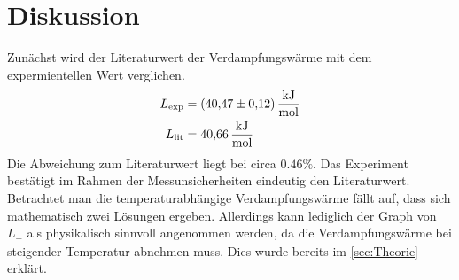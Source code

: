 \section{Diskussion}
\label{sec:Diskussion}
Zunächst wird der Literaturwert \cite{Ingenieurwissen} der Verdampfungswärme mit dem expermientellen Wert verglichen. 
\begin{align*}
    L_\text{exp} &= \qty{40.47 +- 0.12}{\kilo\joule\per\mol} \\
    L_\text{lit} &= \qty{40.66}{\kilo\joule\per\mol}
\end{align*}
Die Abweichung zum Literaturwert liegt bei circa $0.46\%$. Das Experiment bestätigt  im Rahmen der Messunsicherheiten eindeutig den Literaturwert.
Betrachtet man die temperaturabhängige Verdampfungswärme fällt auf, dass sich mathematisch zwei Lösungen ergeben. Allerdings kann lediglich der Graph von $L_+$ als physikalisch sinnvoll angenommen
werden, da die Verdampfungswärme bei steigender Temperatur abnehmen muss. Dies wurde bereits im \autoref{sec:Theorie} erklärt. 
